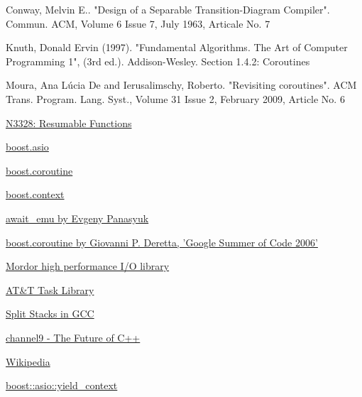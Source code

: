 \begin{thebibliography}{99}

        {Conway, Melvin E.. "Design of a Separable Transition-Diagram Compiler".
         Commun. ACM, Volume 6 Issue 7, July 1963, Articale No. 7}

        {Knuth, Donald Ervin (1997). "Fundamental Algorithms. The Art of Computer Programming 1", (3rd ed.).
         Addison-Wesley. Section 1.4.2: Coroutines}

        {Moura, Ana L\'{u}cia De and Ierusalimschy, Roberto. "Revisiting coroutines".
         ACM Trans. Program. Lang. Syst., Volume 31 Issue 2, February 2009, Article No. 6}

        \href{http://www.open-std.org/jtc1/sc22/wg21/docs/papers/2012/n3328.pdf}
        {N3328: Resumable Functions}

        \href{http://www.boost.org/doc/libs/1_54_0/doc/html/boost_asio.html}
        {boost.asio}

        \href{http://www.boost.org/doc/libs/1_54_0/libs/coroutine/doc/html/index.html}
        {boost.coroutine}

        \href{http://www.boost.org/doc/libs/1_54_0/libs/context/doc/html/index.html}
        {boost.context}

        \href{http://github.com/panaseleus/await_emu}
        {await\_emu by Evgeny Panasyuk}

        \href{http://www.crystalclearsoftware.com/soc/coroutine/}
        {boost.coroutine by Giovanni P. Deretta, 'Google Summer of Code 2006'}

        \href{http://code.mozy.com/projects/mordor}
        {Mordor high performance I/O library}

        \href{http://www.softwarepreservation.org/projects/c_plus_plus/cfront/release_2.0/doc/LibraryManual.pdf}
        {AT\&T Task Library}

        \href{http://gcc.gnu.org/wiki/SplitStacks}
        {Split Stacks in GCC}

        \href{http://channel9.msdn.com/Events/Build/2013/2-306#c635084523858527973}
        {channel9 - The Future of C++}

        \href{http://en.wikipedia.org/wiki/Coroutine#Programming_languages_with_native_support}
        {Wikipedia}

        \href{http://www.boost.org/doc/libs/1_54_0/doc/html/boost_asio/reference/yield_context.html}
        {boost::asio::yield\_context}

\end{thebibliography}

